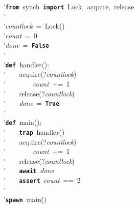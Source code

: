 \'\>\texttt{\textbf{from}}~synch~\texttt{\textbf{import}}~Lock,~acquire,~release\\

\'\>\\

\'\>\textit{countlock}~=~Lock()\\

\'\>\textit{count}~=~0\\

\'\>\textit{done}~=~\texttt{\textbf{False}}\\

\'\>\\

\'\>\texttt{\textbf{def}}~handler():\\

\'\>~~~~acquire(?\textit{countlock})\\

\'\>~~~~~~~~\textit{count}~+=~1\\

\'\>~~~~release(?\textit{countlock})\\

\'\>~~~~\textit{done}~=~\texttt{\textbf{True}}\\

\'\>\\

\'\>\texttt{\textbf{def}}~main():\\

\'\>~~~~\texttt{\textbf{trap}}~handler()\\

\'\>~~~~acquire(?\textit{countlock})\\

\'\>~~~~~~~~\textit{count}~+=~1\\

\'\>~~~~release(?\textit{countlock})\\

\'\>~~~~\texttt{\textbf{await}}~\textit{done}\\

\'\>~~~~\texttt{\textbf{assert}}~\textit{count}~==~2\\

\'\>\\

\'\>\texttt{\textbf{spawn}}~main()
